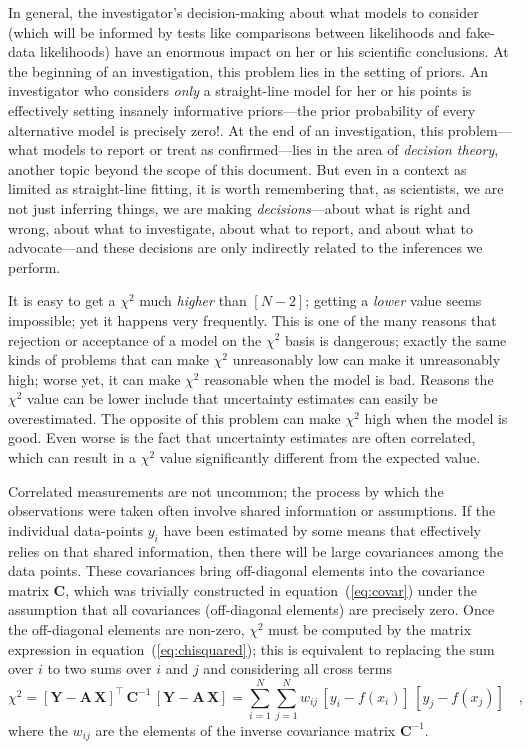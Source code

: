\documentclass[12pt,twoside]{article}
\newcommand{\documentname}{document}
\newcommand{\equationname}{equation}
\newcounter{problem}
\newcommand{\mmatrix}[1]{\boldsymbol{#1}}
\newcommand{\inverse}[1]{{#1}^{-1}}
\newcommand{\transpose}[1]{{#1}^{\scriptscriptstyle \top}}
\newcommand{\mA}{\mmatrix{A}}
\newcommand{\mC}{\mmatrix{C}}
\newcommand{\mCinv}{\inverse{\mC}}
\newcommand{\mX}{\mmatrix{X}}
\newcommand{\mY}{\mmatrix{Y}}
\begin{document}
{  In general, the investigator's decision-making about what models to
  consider (which will be informed by tests like comparisons between
  likelihoods and fake-data likelihoods) have an enormous impact on
  her or his scientific conclusions.  At the beginning of an
  investigation, this problem lies in the setting of priors.  An
  investigator who considers \emph{only} a straight-line model for her
  or his points is effectively setting insanely informative
  priors---the prior probability of every alternative model is
  precisely zero!.  At the end of an investigation, this
  problem---what models to report or treat as confirmed---lies in the
  area of \emph{decision theory}, another topic beyond the scope of
  this \documentname.  But even in a context as limited as
  straight-line fitting, it is worth remembering that, as scientists,
  we are not just inferring things, we are making
  \emph{decisions}---about what is right and wrong, about what to
  investigate, about what to report, and about what to advocate---and
  these decisions are only indirectly related to the inferences we
  perform.}

It is easy to get a $\chi^2$ much \emph{higher} than $[N-2]$; getting
a \emph{lower} value seems impossible; yet it happens very frequently.
This is one of the many reasons that rejection or acceptance of a
model on the $\chi^2$ basis is dangerous; exactly the same kinds of
problems that can make $\chi^2$ unreasonably low can make it
unreasonably high; worse yet, it can make $\chi^2$ reasonable when the
model is bad.  Reasons the $\chi^2$ value can be lower include that
uncertainty estimates can easily be overestimated. The opposite of
this problem can make $\chi^2$ high when the model is good. Even worse
is the fact that uncertainty estimates are often correlated, which can
result in a $\chi^2$ value significantly different from the expected
value.

Correlated measurements are not uncommon; the process by which the
observations were taken often involve shared information or
assumptions. If the individual data-points $y_i$ have been estimated
by some means that effectively relies on that shared information, then
there will be large covariances among the data points.  These
covariances bring off-diagonal elements into the covariance matrix
$\mC$, which was trivially constructed in
\equationname~(\ref{eq:covar}) under the assumption that all
covariances (off-diagonal elements) are precisely zero.  Once the
off-diagonal elements are non-zero, $\chi^2$ must be computed by the
matrix expression in \equationname~(\ref{eq:chisquared}); this is
equivalent to replacing the sum over $i$ to two sums over $i$ and $j$
and considering all cross terms
\begin{equation}
\chi^2 =
 \transpose{\left[\mY-\mA\,\mX\right]}\,\mCinv\,\left[\mY-\mA\,\mX\right]
 = \sum_{i=1}^N \sum_{j=1}^N
 w_{ij}\,\left[y_i-f(x_i)\right]\,\left[y_j-f(x_j)\right]
 \quad,
\end{equation} 
where the $w_{ij}$ are the elements of the inverse covariance
matrix $\inverse{\mC}$.
\end{document}
